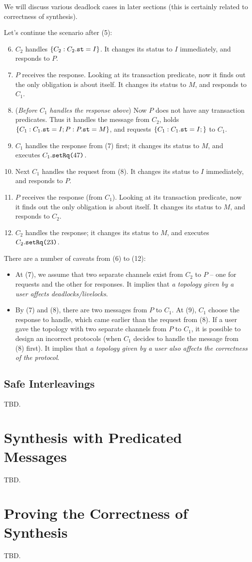 \documentclass[format=manuscript]{acmart}
\begin{document}
We will discuss various deadlock cases in later sections (this is certainly
related to correctness of synthesis).

Let's continue the scenario after (5):

\begin{enumerate}
  \setcounter{enumi}{5}
\item $C_2$ handles $\{ C_2: C_2.\texttt{st} = I \}$. It changes its status to $I$
  immediately, and responds to $P$.
\item $P$ receives the response. Looking at its transaction predicate, now it
  finds out the only obligation is about itself. It changes its status to $M$,
  and responds to $C_1$.
\item (\emph{Before $C_1$ handles the response above}) Now $P$ does not have any
  transaction predicates. Thus it handles the message from $C_2$, holds $\{ C_1:
  C_1.\texttt{st} = I; P: P.\texttt{st} = M \}$, and requests $\{ C_1: C_1.\texttt{st} = I; \}$
  to $C_1$.
\item $C_1$ handles the response from (7) first; it changes its status to $M$,
  and executes $C_1.\texttt{setRq(}47\texttt{)}$.
\item Next $C_1$ handles the request from (8). It changes its status to $I$
  immediately, and responds to $P$.
\item $P$ receives the response (from $C_1$). Looking at its transaction
  predicate, now it finds out the only obligation is about itself. It changes
  its status to $M$, and responds to $C_2$.
\item $C_2$ handles the response; it changes its status to $M$, and executes
  $C_2.\texttt{setRq(}23\texttt{)}$.
\end{enumerate}

There are a number of caveats from (6) to (12):

\begin{itemize}
\item At (7), we assume that two separate channels exist from $C_2$ to $P$ --
  one for requests and the other for responses. It implies that \emph{a topology
    given by a user affects deadlocks/livelocks}.
\item By (7) and (8), there are two messages from $P$ to $C_1$. At (9), $C_1$
  choose the response to handle, which came earlier than the request from (8).
  If a user gave the topology with two separate channels from $P$ to $C_1$, it
  is possible to design an incorrect protocols (when $C_1$ decides to handle the
  message from (8) first). It implies that \emph{a topology given by a user also
    affects the correctness of the protocol}.
\end{itemize}

\subsection{Safe Interleavings}

TBD.

\section{Synthesis with Predicated Messages}

TBD.

\section{Proving the Correctness of Synthesis}

TBD.
\end{document}
